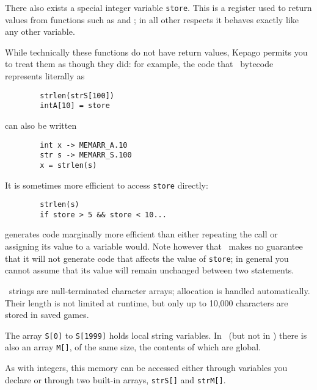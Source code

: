       There also exists a special integer variable \lstinline|store|.  This is a
      register used to return values from functions such as  and
      ; in all other respects it behaves exactly like any other
      variable.

      While technically these functions do not have return values, Kepago
      permits you to treat them as though they did: for example, the code that
      \reallive\ bytecode represents literally as
      \begin{lstlisting}
        strlen(strS[100])
        intA[10] = store
      \end{lstlisting}
      can also be written
      \begin{lstlisting}
        int x -> MEMARR_A.10
        str s -> MEMARR_S.100
        x = strlen(s)
      \end{lstlisting}
      It is sometimes more efficient to access \lstinline|store| directly:
      \begin{lstlisting}
        strlen(s)
        if store > 5 && store < 10...
      \end{lstlisting}
      \noindent generates code marginally more efficient than either repeating
      the  call or assigning its value to a variable would.  Note 
      however that \compiler\ makes no guarantee that it will not generate
      code that affects the value of \lstinline|store|; in general you cannot
      assume that its value will remain unchanged between two statements.



      \reallive\ strings are null-terminated character arrays; allocation is
      handled automatically.  Their length is not limited at runtime, but only
      up to 10,000 characters are stored in saved games.

      The array \lstinline|S[0]| to \lstinline|S[1999]| holds local string
      variables. In \reallive\ (but not in \avgns) there is also an array
      \lstinline|M[]|, of the same size, the contents of which are global.
      
      As with integers, this memory can be accessed either through variables
      you declare or through two built-in arrays, \lstinline|strS[]| and
      \lstinline|strM[]|.

    \label{sec:namevars}

